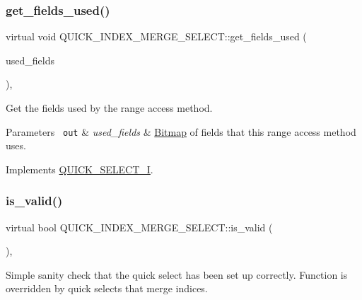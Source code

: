 \subsubsection{\texorpdfstring{get\+\_\+fields\+\_\+used()}{get\_fields\_used()}}
{\footnotesize\ttfamily virtual void Q\+U\+I\+C\+K\+\_\+\+I\+N\+D\+E\+X\+\_\+\+M\+E\+R\+G\+E\+\_\+\+S\+E\+L\+E\+C\+T\+::get\+\_\+fields\+\_\+used (\begin{DoxyParamCaption}\item[{M\+Y\+\_\+\+B\+I\+T\+M\+AP $\ast$}]{used\+\_\+fields }\end{DoxyParamCaption})\hspace{0.3cm}{\ttfamily [inline]}, {\ttfamily [virtual]}}

Get the fields used by the range access method.


\begin{DoxyParams}[1]{Parameters}
\mbox{\texttt{ out}}  & {\em used\+\_\+fields} & \mbox{\hyperlink{classBitmap}{Bitmap}} of fields that this range access method uses. \\
\hline
\end{DoxyParams}


Implements \mbox{\hyperlink{classQUICK__SELECT__I_a369861adc70c029a3eb4134e8b7cce4f}{Q\+U\+I\+C\+K\+\_\+\+S\+E\+L\+E\+C\+T\+\_\+I}}.

\mbox{\label{classQUICK__INDEX__MERGE__SELECT_a1feb668246b5f37b92cf069ac544337b}} 
\subsubsection{\texorpdfstring{is\+\_\+valid()}{is\_valid()}}
{\footnotesize\ttfamily virtual bool Q\+U\+I\+C\+K\+\_\+\+I\+N\+D\+E\+X\+\_\+\+M\+E\+R\+G\+E\+\_\+\+S\+E\+L\+E\+C\+T\+::is\+\_\+valid (\begin{DoxyParamCaption}{ }\end{DoxyParamCaption})\hspace{0.3cm}{\ttfamily [inline]}, {\ttfamily [virtual]}}

Simple sanity check that the quick select has been set up correctly. Function is overridden by quick selects that merge indices. 

